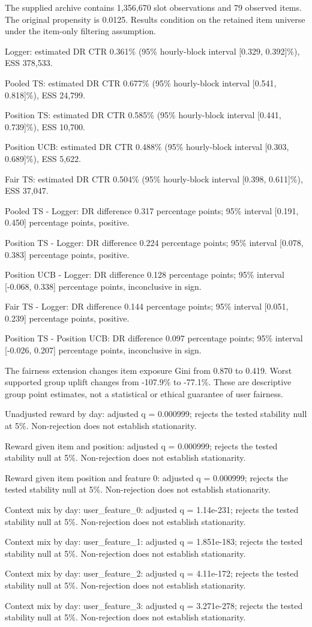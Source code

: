 The supplied archive contains 1,356,670 slot observations and 79 observed items. The original propensity is 0.0125. Results condition on the retained item universe under the item-only filtering assumption.

Logger: estimated DR CTR 0.361\% (95\% hourly-block interval [0.329, 0.392]\%), ESS 378,533.

Pooled TS: estimated DR CTR 0.677\% (95\% hourly-block interval [0.541, 0.818]\%), ESS 24,799.

Position TS: estimated DR CTR 0.585\% (95\% hourly-block interval [0.441, 0.739]\%), ESS 10,700.

Position UCB: estimated DR CTR 0.488\% (95\% hourly-block interval [0.303, 0.689]\%), ESS 5,622.

Fair TS: estimated DR CTR 0.504\% (95\% hourly-block interval [0.398, 0.611]\%), ESS 37,047.

Pooled TS - Logger: DR difference 0.317 percentage points; 95\% interval [0.191, 0.450] percentage points, positive.

Position TS - Logger: DR difference 0.224 percentage points; 95\% interval [0.078, 0.383] percentage points, positive.

Position UCB - Logger: DR difference 0.128 percentage points; 95\% interval [-0.068, 0.338] percentage points, inconclusive in sign.

Fair TS - Logger: DR difference 0.144 percentage points; 95\% interval [0.051, 0.239] percentage points, positive.

Position TS - Position UCB: DR difference 0.097 percentage points; 95\% interval [-0.026, 0.207] percentage points, inconclusive in sign.

The fairness extension changes item exposure Gini from 0.870 to 0.419. Worst supported group uplift changes from -107.9\% to -77.1\%. These are descriptive group point estimates, not a statistical or ethical guarantee of user fairness.

Unadjusted reward by day: adjusted q = 0.000999; rejects the tested stability null at 5\%. Non-rejection does not establish stationarity.

Reward given item and position: adjusted q = 0.000999; rejects the tested stability null at 5\%. Non-rejection does not establish stationarity.

Reward given item position and feature 0: adjusted q = 0.000999; rejects the tested stability null at 5\%. Non-rejection does not establish stationarity.

Context mix by day: user\_feature\_0: adjusted q = 1.14e-231; rejects the tested stability null at 5\%. Non-rejection does not establish stationarity.

Context mix by day: user\_feature\_1: adjusted q = 1.851e-183; rejects the tested stability null at 5\%. Non-rejection does not establish stationarity.

Context mix by day: user\_feature\_2: adjusted q = 4.11e-172; rejects the tested stability null at 5\%. Non-rejection does not establish stationarity.

Context mix by day: user\_feature\_3: adjusted q = 3.271e-278; rejects the tested stability null at 5\%. Non-rejection does not establish stationarity.
